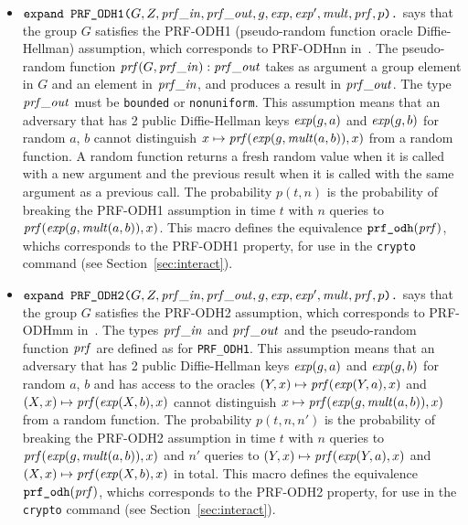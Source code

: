 \documentclass{article}
\begin{document}
\begin{itemize}
\begin{itemize}
\begin{itemize}
     \item $\texttt{expand\ PRF\_ODH1(}G, Z, \mathit{prf\_in}, \mathit{prf\_out}, g, \mathit{exp}, \mathit{exp}', \mathit{mult}, \mathit{prf}, p\texttt{).}$ says that the group $G$ satisfies the PRF-ODH1 (pseudo-random function oracle Diffie-Hellman) assumption, which corresponds to PRF-ODHnn in~\cite{eprint2017:517}.
       The pseudo-random function $\mathit{prf}(G, \mathit{prf\_in}): \mathit{prf\_out}$ takes as argument a group element in $G$ and an element in $\mathit{prf\_in}$, and produces a result in $\mathit{prf\_out}$. The type $\mathit{prf\_out}$ must be \texttt{bounded} or \texttt{nonuniform}.
   This assumption means that an adversary that has 2 public Diffie-Hellman keys $\mathit{exp}(g,a)$ and $\mathit{exp}(g,b)$ for random $a$, $b$ cannot distinguish $x \mapsto \mathit{prf}(\mathit{exp}(g,\mathit{mult}(a,b)),x)$ from a random function. A random function returns a fresh random value when it is called with a new argument and the previous result when it is called with the same argument as a previous call. The probability $p(t, n)$ is the probability of breaking the PRF-ODH1 assumption
   in time $t$ with $n$ queries to $\mathit{prf}(\mathit{exp}(g,\mathit{mult}(a,b)),x)$.
This macro defines the equivalence
       $\texttt{prf\_odh}(\mathit{prf})$, whichs corresponds to the PRF-ODH1 property, for use in the \texttt{crypto} command (see
       Section~\ref{sec:interact}).
     \item $\texttt{expand\ PRF\_ODH2(}G, Z, \mathit{prf\_in}, \mathit{prf\_out}, g, \mathit{exp}, \mathit{exp}', \mathit{mult}, \mathit{prf}, p\texttt{).}$ says that the group $G$ satisfies the PRF-ODH2 assumption, which corresponds to PRF-ODHmm in~\cite{eprint2017:517}.
       The types $\mathit{prf\_in}$ and $\mathit{prf\_out}$ and the pseudo-random function $\mathit{prf}$ are defined as for \texttt{PRF\_ODH1}.
       This assumption means that an adversary that has 2 public Diffie-Hellman keys $\mathit{exp}(g,a)$ and $\mathit{exp}(g,b)$ for random $a$, $b$ and has access to the oracles $(Y,x) \mapsto \mathit{prf}(\mathit{exp}(Y,a),x)$ and $(X,x) \mapsto \mathit{prf}(\mathit{exp}(X,b),x)$ cannot distinguish $x \mapsto \mathit{prf}(\mathit{exp}(g,\mathit{mult}(a,b)),x)$ from a random function.
The probability $p(t, n, n')$ is the probability of breaking the PRF-ODH2 assumption
   in time $t$ with $n$ queries to $\mathit{prf}(\mathit{exp}(g,\mathit{mult}(a,b)),x)$ and $n'$ queries to $(Y,x) \mapsto \mathit{prf}(\mathit{exp}(Y,a),x)$ and $(X,x) \mapsto \mathit{prf}(\mathit{exp}(X,b),x)$ in total.
This macro defines the equivalence
       $\texttt{prf\_odh}(\mathit{prf})$, whichs corresponds to the PRF-ODH2 property, for use in the \texttt{crypto} command (see
Section~\ref{sec:interact}).


\end{itemize}
\end{itemize}
\end{itemize}
\end{document}
